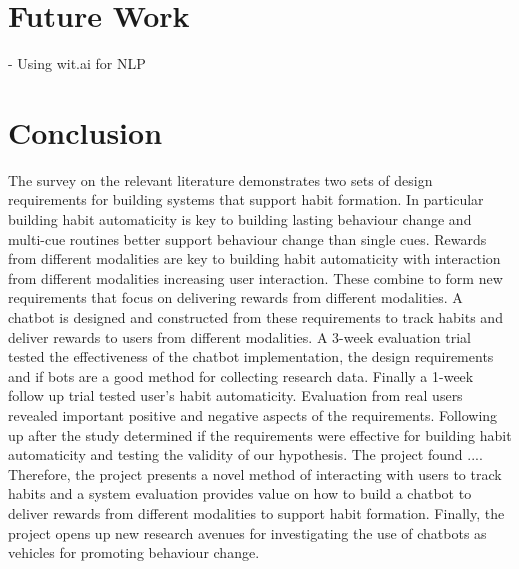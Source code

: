 
\newpage

\section{Future Work}

-  Using wit.ai for NLP


\section{Conclusion}

The survey on the relevant literature demonstrates two sets of design requirements for building systems that support habit formation.
In particular building habit automaticity is key to building lasting behaviour change and multi-cue routines better support behaviour change than single cues.
Rewards from different modalities are key to building habit automaticity with interaction from different modalities increasing user interaction.
These combine to form new requirements that focus on delivering rewards from different modalities.\newline
\newline
A chatbot is designed and constructed from these requirements to track habits and deliver rewards to users from different modalities.
A 3-week evaluation trial tested the effectiveness of the chatbot implementation, the design requirements and if bots are a good method for collecting research data.
Finally a 1-week follow up trial tested user's habit automaticity.\newline
\newline
Evaluation from real users revealed important positive and negative aspects of the requirements.
Following up after the study determined if the requirements were effective for building habit automaticity and testing the validity of our hypothesis.\newline
The project found ....\newline
\newline
Therefore, the project presents a novel method of interacting with users to track habits and a system evaluation provides value
on how to build a chatbot to deliver rewards from different modalities to support habit formation.
Finally, the project opens up new research avenues for investigating the use of chatbots as vehicles for promoting behaviour change.
